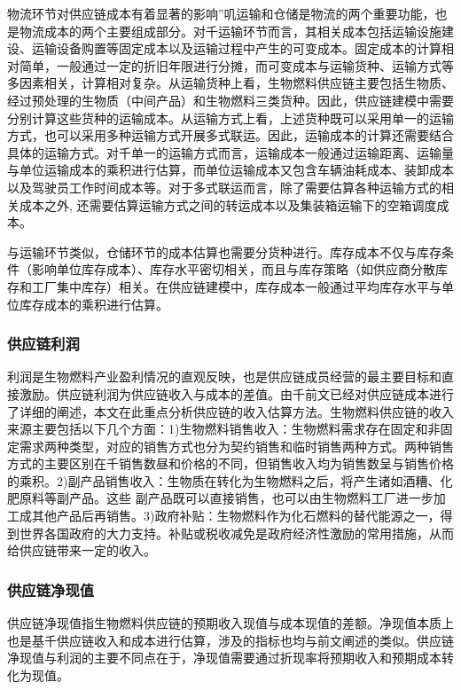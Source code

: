 物流环节对供应链成本有着显著的影响”叽运输和仓储是物流的两个重要功能，也是物流成本的两个主要组成部分。对千运输环节而言，其相关成本包括运输设施建设、运输设备购置等固定成本以及运输过程中产生的可变成本。固定成本的计算相对简单，一般通过一定的折旧年限进行分摊，而可变成本与运输货种、运输方式等多因素相关，计算相对复杂。从运输货种上看，生物燃料供应链主要包括生物质、经过预处理的生物质（中间产品）和生物燃料三类货种。因此，供应链建模中需要分别计算这些货种的运输成本\cite{Chaabane2012}。从运输方式上看，上述货种既可以采用单一的运输方式，也可以采用多种运输方式开展多式联运。因此，运输成本的计算还需要结合具体的运输方式。对千单一的运输方式而言，运输成本一般通过运输距离、运输量与单位运输成本的乘积进行估算，而单位运输成本又包含车辆油耗成本、装卸成本以及驾驶员工作时间成本等\cite{Chen2012}。对于多式联运而言，除了需要估算各种运输方式的相关成本之外\cite{Sabio2012}, 还需要估算运输方式之间的转运成本以及集装箱运输下的空箱调度成本\cite{Marufuzzaman2014}。

与运输环节类似，仓储环节的成本估算也需要分货种进行。库存成本不仅与库存条件（影响单位库存成本）、库存水平密切相关，而且与库存策略（如供应商分散库存和工厂集中库存）相关。在供应链建模中，库存成本一般通过平均库存水平与单位库存成本的乘积进行估算\cite{Correll2014}。

\subsubsection{供应链利润}
利润是生物燃料产业盈利情况的直观反映，也是供应链成员经营的最主要目标和直 接激励。供应链利润为供应链收入与成本的差值\cite{Li2014}。由千前文已经对供应链成本进行了详细的阐述，本文在此重点分析供应链的收入估算方法。生物燃料供应链的收入来源主要包括以下几个方面：1)生物燃料销售收入：生物燃料需求存在固定和非固定需求两种类型，对应的销售方式也分为契约销售和临时销售两种方式\cite{Shabani2014}。两种销售方式的主要区别在千销售数昼和价格的不同，但销售收入均为销售数呈与销售价格的乘积。2)副产品销售收入：生物质在转化为生物燃料之后，将产生诸如酒糟、化肥原料等副产品。这些 副产品既可以直接销售，也可以由生物燃料工厂进一步加工成其他产品后再销售\cite{Balaman2014}。3)政府补贴：生物燃料作为化石燃料的替代能源之一，得到世界各国政府的大力支持。补贴或税收减免是政府经济性激励的常用措施，从而给供应链带来一定的收入\cite{Osmani2013,Osmani2014}。

\subsubsection{供应链净现值}
供应链净现值指生物燃料供应链的预期收入现值与成本现值的差额。净现值本质上也是基千供应链收入和成本进行估算\cite{Marvin2012,Giarola2012,Giarola2012,Sabio2012,Zamboni2011}，涉及的指标也均与前文阐述的类似。供应链净现值与利润的主要不同点在于，净现值需要通过折现率将预期收入和预期成本转化为现值。


